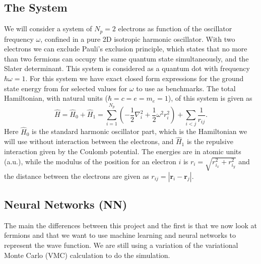 \documentclass[12pt,a4paper,english]{article}
\begin{document}
\subsection{The System}
\label{subsect:System}
We will consider a system of $N_p=2$ electrons as function of the oscillator frequency $\omega$, confined in a pure 2D isotropic harmonic oscillator. With two electrons we can exclude Pauli's exclusion principle, which states that no more than two fermions can occupy the same quantum state simultaneously, and the Slater determinant. This system is considered as a quantum dot with frequency $\hbar\omega=1$. For this system we have exact closed form expressions for the ground state energy from \citet{taut1993two} for selected values for $\omega$ to use as benchmarks. The total Hamiltonian, with natural units ($\hbar=c=e=m_e=1$), of this system is given as 
\begin{equation}
\label{eq:Hamlitonian}
\hat{H}=\hat{H}_0+\hat{H}_1=\sum_{i=1}^{N_p}\left(-\frac{1}{2}\nabla^2_i + \frac{1}{2}\omega^2r_i^2\right) + \sum_{i<j}\frac{1}{r_{ij}}.
\end{equation}
Here $\hat{H}_0$ is the standard harmonic oscillator part, which is the Hamiltonian we will use without interaction between the electrons, and $\hat{H}_1$ is the repulsive interaction given by the Coulomb potential. The energies are in atomic units (a.u.), while the modulus of the position for an electron $i$ is $r_i=\sqrt{r^2_{i_x}+r^2_{i_y}}$ and the distance between the electrons are given as $r_{ij}=|\textbf{r}_i-\textbf{r}_j|$.

\subsection{Neural Networks (NN)}
\label{subsect:NN}
The main the differences between this project and the first is that we now look at fermions and that we want to use machine learning and neural networks to represent the wave function. We are still using a variation of the variational Monte Carlo (VMC) calculation to do the simulation.
\end{document}

